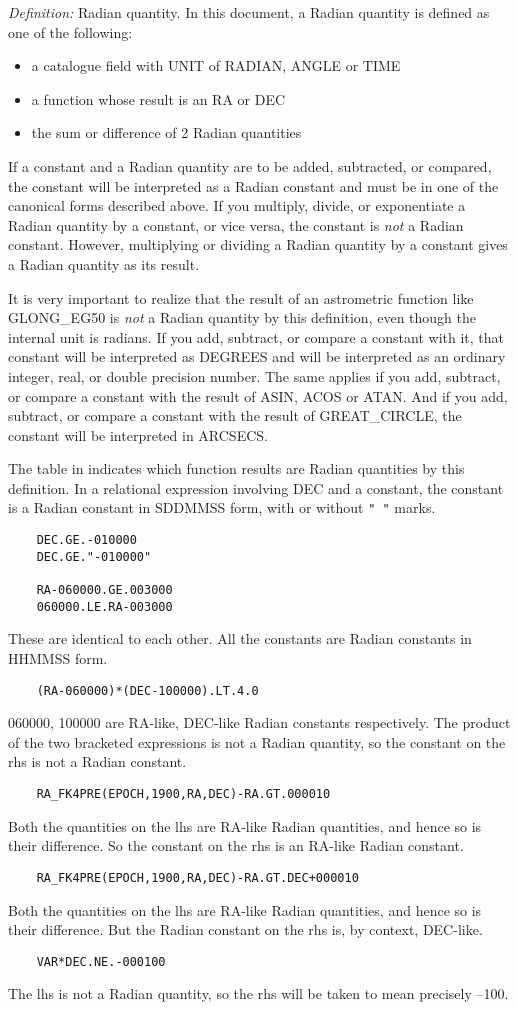 {\em Definition:} Radian quantity.
In this document, a Radian quantity is defined as one of the following:
\begin{itemize}
\item a catalogue field with UNIT of RADIAN, ANGLE or TIME
\item a function whose result is an RA or DEC
\item the sum or difference of 2 Radian quantities
\end{itemize}
If a constant and a Radian quantity are to be added, subtracted, or compared,
the constant will be interpreted as a Radian constant and must be in one of the
canonical forms described above.
If you multiply, divide, or exponentiate a Radian quantity by a constant, or
vice versa, the constant is {\em not} a Radian constant.
However, multiplying or dividing a Radian quantity by a constant gives a
Radian quantity as its result.

It is very important to realize that the result of an astrometric function like
GLONG\_EG50 is {\em not} a Radian quantity by this definition, even though the
internal unit is radians.
If you add, subtract, or compare a constant with it, that constant will be
interpreted as DEGREES and will be interpreted as an ordinary integer, real, or
double precision number.
The same applies if you add, subtract, or compare a constant with the result of
ASIN, ACOS or ATAN.   
And if you add, subtract, or compare a constant with the result of
GREAT\_CIRCLE, the constant will be interpreted in ARCSECS.

The table in indicates which function results are Radian quantities by
this definition.
In a relational expression involving DEC and a constant, the constant is a
Radian constant in SDDMMSS form, with or without {\tt " "} marks.
\begin{verbatim}
    DEC.GE.-010000
    DEC.GE."-010000"

    RA-060000.GE.003000
    060000.LE.RA-003000
\end{verbatim}
These are identical to each other.
All the constants are Radian constants in HHMMSS form.
\begin{verbatim}
    (RA-060000)*(DEC-100000).LT.4.0
\end{verbatim}
060000, 100000 are RA-like, DEC-like Radian constants respectively.
The product of the two bracketed expressions is not a Radian quantity, so the
constant on the rhs is not a Radian constant.
\begin{verbatim}
    RA_FK4PRE(EPOCH,1900,RA,DEC)-RA.GT.000010
\end{verbatim}
Both the quantities on the lhs are RA-like Radian quantities, and hence so is
their difference.
So the constant on the rhs is an RA-like Radian constant.
\begin{verbatim}
    RA_FK4PRE(EPOCH,1900,RA,DEC)-RA.GT.DEC+000010
\end{verbatim}
Both the quantities on the lhs are RA-like Radian quantities, and hence so is
their difference.
But the Radian constant on the rhs is, by context, DEC-like.
\begin{verbatim}
    VAR*DEC.NE.-000100
\end{verbatim}
The lhs is not a Radian quantity, so the rhs will be taken to mean precisely
--100.

